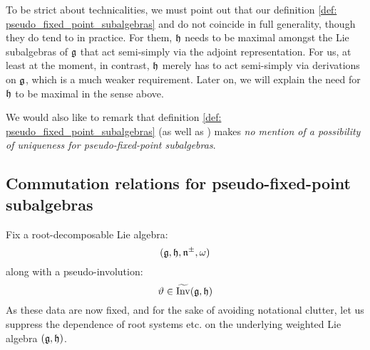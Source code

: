         \begin{remark}
            To be strict about technicalities, we must point out that our definition \eqref{def: pseudo_fixed_point_subalgebras} and \cite[Definition 1.2]{regelskis_vlaar_kac_moody_pseudo_symmetric_pairs} do not coincide in full generality, though they do tend to in practice. For them, $\mathfrak{h}$ needs to be maximal amongst the Lie subalgebras of $\mathfrak{g}$ that act semi-simply via the adjoint representation. For us, at least at the moment, in contrast, $\mathfrak{h}$ merely has to act semi-simply via derivations on $\mathfrak{g}$, which is a much weaker requirement. Later on, we will explain the need for $\mathfrak{h}$ to be maximal in the sense above.
            
            We would also like to remark that definition \ref{def: pseudo_fixed_point_subalgebras} (as well as \cite[Definition 1.2]{regelskis_vlaar_kac_moody_pseudo_symmetric_pairs}) makes \textit{no mention of a possibility of uniqueness for pseudo-fixed-point subalgebras}.
        \end{remark}

    \subsection{Commutation relations for pseudo-fixed-point subalgebras} \label{subsection: commutation_relations_for_pseudo_fixed_point_subalgebras}
        Fix a root-decomposable Lie algebra:
            $$(\mathfrak{g}, \mathfrak{h}, \mathfrak{n}^{\pm}, \omega)$$
        along with a pseudo-involution:
            $$\vartheta \in \widetilde{\operatorname{Inv}}(\mathfrak{g}, \mathfrak{h})$$
        As these data are now fixed, and for the sake of avoiding notational clutter, let us suppress the dependence of root systems etc. on the underlying weighted Lie algebra $(\mathfrak{g}, \mathfrak{h})$.
        
